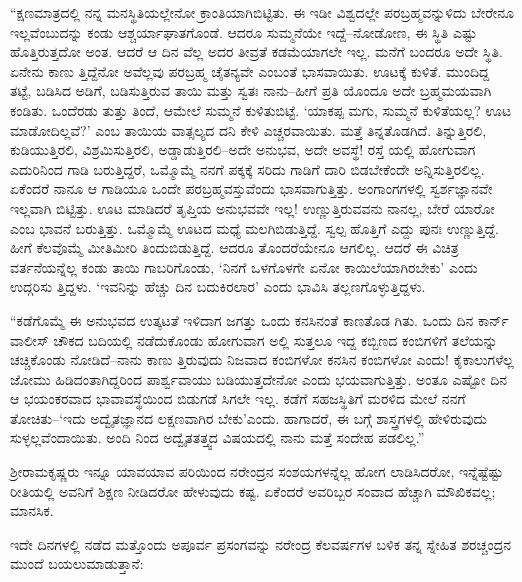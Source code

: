“ಕ್ಷಣಮಾತ್ರದಲ್ಲಿ ನನ್ನ ಮನಸ್ಥಿತಿಯಲ್ಲೇನೋ ಕ್ರಾಂತಿಯಾಗಿಬಿಟ್ಟಿತು. ಈ ಇಡೀ ವಿಶ್ವದಲ್ಲೇ ಪರಬ್ರಹ್ಮವನ್ನುಳಿದು ಬೇರೇನೂ ಇಲ್ಲವೆಂಬುದನ್ನು ಕಂಡು ಆಶ್ಚರ್ಯಾಘಾತಗೊಂಡೆ. ಆದರೂ ಸುಮ್ಮನೆಯೇ ಇದ್ದೆ–ನೋಡೋಣ, ಈ ಸ್ಥಿತಿ ಎಷ್ಟು ಹೊತ್ತಿರುತ್ತದೋ ಅಂತ. ಆದರೆ ಆ ದಿನ ವೆಲ್ಲ ಅದರ ತೀವ್ರತೆ ಕಡಮೆಯಾಗಲೇ ಇಲ್ಲ. ಮನೆಗೆ ಬಂದರೂ ಅದೇ ಸ್ಥಿತಿ. ಏನೇನು ಕಾಣು ತ್ತಿದ್ದೆನೋ ಅವೆಲ್ಲವು ಪರಬ್ರಹ್ಮ ಚೈತನ್ಯವೇ ಎಂಬಂತೆ ಭಾಸವಾಯಿತು. ಊಟಕ್ಕೆ ಕುಳಿತೆ. ಮುಂದಿದ್ದ ತಟ್ಟೆ, ಬಡಿಸಿದ ಅಡಿಗೆ, ಬಡಿಸುತ್ತಿರುವ ತಾಯಿ ಮತ್ತು ಸ್ವತಃ ನಾನು–ಹೀಗೆ ಪ್ರತಿ ಯೊಂದೂ ಅದೇ ಬ್ರಹ್ಮಮಯವಾಗಿ ಕಂಡಿತು. ಒಂದೆರಡು ತುತ್ತು ತಿಂದೆ, ಆಮೇಲೆ ಸುಮ್ಮನೆ ಕುಳಿತುಬಿಟ್ಟೆ. ‘ಯಾಕಪ್ಪ ಮಗು, ಸುಮ್ಮನೆ ಕುಳಿತೆಯಲ್ಲ? ಊಟ ಮಾಡೋದಿಲ್ಲವೆ?’ ಎಂಬ ತಾಯಿಯ ವಾತ್ಸಲ್ಯದ ದನಿ ಕೇಳಿ ಎಚ್ಚರವಾಯಿತು. ಮತ್ತೆ ತಿನ್ನತೊಡಗಿದೆ. ತಿನ್ನುತ್ತಿರಲಿ, ಕುಡಿಯುತ್ತಿರಲಿ, ವಿಶ್ರಮಿಸುತ್ತಿರಲಿ, ಅಡ್ಡಾಡುತ್ತಿರಲಿ–ಅದೇ ಅನುಭವ, ಅದೇ ಅವಸ್ಥೆ! ರಸ್ತೆ ಯಲ್ಲಿ ಹೋಗುವಾಗ ಎದುರಿನಿಂದ ಗಾಡಿ ಬರುತ್ತಿದ್ದರೆ, ಒಮ್ಮೊಮ್ಮೆ ನನಗೆ ಪಕ್ಕಕ್ಕೆ ಸರಿದು ಗಾಡಿಗೆ ದಾರಿ ಬಿಡಬೇಕೆಂದೇ ಅನ್ನಿಸುತ್ತಿರಲಿಲ್ಲ. ಏಕೆಂದರೆ ನಾನೂ ಆ ಗಾಡಿಯೂ ಒಂದೇ ಪರಬ್ರಹ್ಮವಸ್ತುವೆಂದು ಭಾಸವಾಗುತ್ತಿತ್ತು. ಅಂಗಾಂಗಗಳಲ್ಲಿ ಸ್ವರ್ಶಜ್ಞಾನವೇ ಇಲ್ಲವಾಗಿ ಬಿಟ್ಟಿತ್ತು. ಊಟ ಮಾಡಿದರೆ ತೃಪ್ತಿಯ ಅನುಭವವೇ ಇಲ್ಲ! ಉಣ್ಣುತ್ತಿರುವವನು ನಾನಲ್ಲ, ಬೇರೆ ಯಾರೋ ಎಂಬ ಭಾವನೆ ಬರುತ್ತಿತ್ತು. ಒಮ್ಮೊಮ್ಮೆ ಊಟದ ಮಧ್ಯೆ ಮಲಗಿಬಿಡುತ್ತಿದ್ದೆ. ಸ್ವಲ್ಪ ಹೊತ್ತಿಗೆ ಎದ್ದು ಪುನಃ ಉಣ್ಣುತ್ತಿದ್ದೆ. ಹೀಗೆ ಕೆಲವೊಮ್ಮೆ ಮೀತಿಮೀರಿ ತಿಂದುಬಿಡುತ್ತಿದ್ದೆ. ಆದರೂ ತೊಂದರೆಯೇನೂ ಆಗಲಿಲ್ಲ. ಆದರೆ ಈ ವಿಚಿತ್ರ ವರ್ತನೆಯನ್ನೆಲ್ಲ ಕಂಡು ತಾಯಿ ಗಾಬರಿಗೊಂಡು, ‘ನಿನಗೆ ಒಳಗೊಳಗೇ ಏನೋ ಕಾಯಿಲೆಯಾಗಿರಬೇಕು’ ಎಂದು ಉದ್ಗರಿಸು ತ್ತಿದ್ದಳು. ‘ಇವನಿನ್ನು ಹೆಚ್ಚು ದಿನ ಬದುಕಿರಲಾರ’ ಎಂದು ಭಾವಿಸಿ ತಲ್ಲಣಗೊಳ್ಳುತ್ತಿದ್ದಳು.

“ಕಡೆಗೊಮ್ಮೆ ಈ ಅನುಭವದ ಉತ್ಕಟತೆ ಇಳಿದಾಗ ಜಗತ್ತು ಒಂದು ಕನಸಿನಂತೆ ಕಾಣತೊಡ ಗಿತು. ಒಂದು ದಿನ ಕಾರ್ನ್ ವಾಲೀಸ್ ಚೌಕದ ಬದಿಯಲ್ಲಿ ನಡೆದುಕೊಂಡು ಹೋಗುವಾಗ ಅಲ್ಲಿ ಸುತ್ತಲೂ ಇದ್ದ ಕಬ್ಬಿಣದ ಕಂಬಿಗಳಿಗೆ ತಲೆಯನ್ನು ಚಚ್ಚಿಕೊಂಡು ನೋಡಿದೆ–ನಾನು ಕಾಣು ತ್ತಿರುವುದು ನಿಜವಾದ ಕಂಬಿಗಳೋ ಕನಸಿನ ಕಂಬಿಗಳೋ ಎಂದು! ಕೈಕಾಲುಗಳೆಲ್ಲ ಜೋಮು ಹಿಡಿದಂತಾಗಿದ್ದರಿಂದ ಪಾರ್ಶ್ವವಾಯು ಬಡಿಯುತ್ತದೇನೋ ಎಂದು ಭಯವಾಗುತ್ತಿತ್ತು. ಅಂತೂ ಎಷ್ಟೋ ದಿನ ಆ ಭಯಂಕರವಾದ ಭಾವಾವಸ್ಥೆಯಿಂದ ಬಿಡುಗಡೆ ಸಿಗಲೇ ಇಲ್ಲ. ಕಡೆಗೆ ಸಹಜಸ್ಥಿತಿಗೆ ಮರಳಿದ ಮೇಲೆ ನನಗೆ ತೋಚಿತು–‘ಇದು ಅದ್ವೈತಜ್ಞಾನದ ಲಕ್ಷಣವಾಗಿರ ಬೇಕು’ಎಂದು. ಹಾಗಾದರೆ, ಈ ಬಗ್ಗೆ ಶಾಸ್ತ್ರಗಳಲ್ಲಿ ಹೇಳಿರುವುದು ಸುಳ್ಳಲ್ಲವೆಂದಾಯಿತು. ಅಂದಿ ನಿಂದ ಅದ್ವೈತತತ್ತ್ವದ ವಿಷಯದಲ್ಲಿ ನಾನು ಮತ್ತೆ ಸಂದೇಹ ಪಡಲಿಲ್ಲ.”

ಶ್ರೀರಾಮಕೃಷ್ಣರು ಇನ್ನೂ ಯಾವಯಾವ ಪರಿಯಿಂದ ನರೇಂದ್ರನ ಸಂಶಯಗಳನ್ನೆಲ್ಲ ಹೋಗ ಲಾಡಿಸಿದರೋ, ಇನ್ನೆಷ್ಟೆಷ್ಟು ರೀತಿಯಲ್ಲಿ ಅವನಿಗೆ ಶಿಕ್ಷಣ ನೀಡಿದರೋ ಹೇಳುವುದು ಕಷ್ಟ. ಏಕೆಂದರೆ ಅವರಿಬ್ಬರ ಸಂವಾದ ಹೆಚ್ಚಾಗಿ ಮೌಖಿಕವಲ್ಲ; ಮಾನಸಿಕ. 

ಇದೇ ದಿನಗಳಲ್ಲಿ ನಡೆದ ಮತ್ತೊಂದು ಅಪೂರ್ವ ಪ್ರಸಂಗವನ್ನು ನರೇಂದ್ರ ಕೆಲವರ್ಷಗಳ ಬಳಿಕ ತನ್ನ ಸ್ನೇಹಿತ ಶರಚ್ಚಂದ್ರನ ಮುಂದೆ ಬಯಲುಮಾಡುತ್ತಾನೆ:

